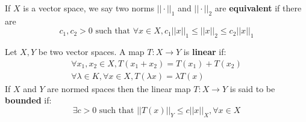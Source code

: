 \documentclass[12pt]{article}
\newenvironment{definition}[2][Definition]{\begin{trivlist}
\item[\hskip \labelsep {\bfseries #1}\hskip \labelsep {\bfseries #2.}]}{\end{trivlist}}
\begin{document}
\begin{definition}{(Equivalent Norms)}
    If $X$ is a vector space, we say two norms $||\cdot||_1$ and $||\cdot||_2$ are \textbf{equivalent} if there are $$c_1, c_2 > 0 \text{ such that } \forall x \in X, c_1||x||_1 \leq ||x||_2 \leq c_2||x||_1$$
\end{definition}

\begin{definition}{(Linear Mapping and Its Boundedness)}
    Let $X, Y$ be two vector spaces. A map $T : X \rightarrow Y$ is \textbf{linear} if:
    \begin{equation}
    \begin{aligned}
        \forall x_1, x_2 \in X, T(x_1 + x_2) = T(x_1) + T(x_2) \\ 
        \forall \lambda \in K, \forall x \in X, T(\lambda x) = \lambda T(x)
    \end{aligned}
    \end{equation}
    If $X$ and $Y$ are normed spaces then the linear map $T : X \rightarrow Y$ is said to be \textbf{bounded} if: $$\exists c > 0 \text{ such that } ||T(x)||_Y \leq c||x||_X, \forall x \in X$$
\end{definition}
\end{document}
